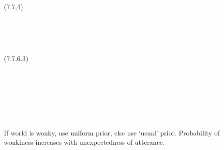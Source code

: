 \documentclass[a0,portrait]{a0poster}
\newcommand{\denote}[1]{\mbox{ $[\![ #1 ]\!]$}}
\newcommand{\gray}[1]{\textcolor{MyGray}{#1}}
\newcommand{\white}[1]{\textcolor{white}{#1}}
\begin{document}
\begin{textblock}{7}
\begin{textblock}{7.5}
\begin{textblock}{3}(7.7,4)  
\white{\textbf{Regular RSA}}
\begin{eqnarray*} 
&&\white{P_{L_0}(s|u)\propto \delta_{\denote{u}(s)} \cdot P(s)}\\
&&\white{P_{S_1}(u|s) \propto \mathrm{exp}({\lambda \ln P_{L_0}(s|u))}}\\ 
&&\white{P_{L_1}(s|u)\propto P_{S_1}(u|s)\cdot P(s)}
\end{eqnarray*}
\end{textblock}



\begin{textblock}{4.2}(7.7,6.3)
\white{\textbf{Wonky RSA (wRSA)}}
\begin{eqnarray*}
&&\white{P_{L_0}(s|u,w)\propto \denote{u}(s) \cdot P(s|w)}\\
&&\white{P_{S_1}(u|s,w) \propto \mathrm{exp}({\lambda \ln P_{L_0}(s|u,w))}}\\
&&\white{P_{L_1}(s,w|u)\propto P_{S_1}(u|s,w)\cdot P(s|w) \cdot P(w)}
\end{eqnarray*}
$$
\white{P(s|w) \propto \begin{cases}
1  & \text{if } w\\
   P_{\text{usual}}(s) & \text{if not } w
  \end{cases}}
  $$
  
\large

If world is wonky, use uniform prior, else use `usual' prior. Probability of wonkiness increases with unexpectedness of utterance.
  
\end{textblock}


\end{textblock}

\end{textblock}

\end{document}
